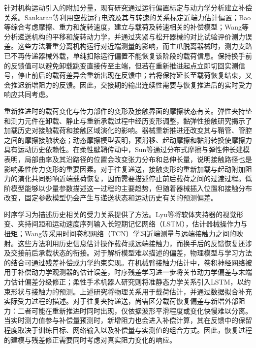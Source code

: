\documentclass{JQRnew}
\begin{document}
针对机构运动引入的附加分量，现有研究通过运行偏置标定与动力学分析建立补偿关系。Sankaran等利用空载运行电流及其与转速的关系标定近端力估计偏置；Bao等综合考虑摩擦、重力和旋转速度，建立与载荷及转速相关的补偿模型；Wang等分析递送机构的平移和旋转动力学，并通过夹紧与松开器械的对比试验评价测力误差。这些方法着重分离机构运行对近端测量的影响，而主爪脱离器械时，测力支路已不再传递器械外载，单纯扣除运行偏置不能恢复该阶段的载荷信息。保持换手前的反馈值可以避免卸载跳变直接传至主端，但若在重新推进起点立即切回实测信号，停止前后的载荷差异会重新出现在反馈中；若将保持延长至载荷恢复结束，又会推迟新增阻力的反馈。因此，交接期的输出连续性需要与恢复推进后的实时受力响应共同考虑。

重新推进时的载荷变化与传力部件的变形及接触界面的摩擦状态有关。弹性夹持垫和测力元件在卸载、静止与重新承载过程中经历变形调整，黏弹性接触研究揭示了加载历史对接触载荷和接触区域演化的影响。器械重新推进还改变其与鞘管、管腔之间的摩擦接触状态；动态摩擦模型表明，预滑移、起动摩擦和黏滑转换使摩擦力具有运动历史依赖性。在柔性腱鞘传动中，Sun等通过分布式摩擦与弹性伸长建模表明，局部曲率及其沿路径的位置会改变张力分布和总伸长量，说明接触路径也是影响柔性传力变形的重要因素。对于往复递送，接触变形的重新加载与起动附加阻力的演化共同影响近端载荷恢复，因而需要描述停止前后载荷之间的过渡过程。低阶模型能够以少量参数描述这一过程的主要趋势，但随着器械插入位置和接触分布改变，固定参数模型仍会产生与递送状态和运动历史有关的预测偏差。

时序学习为描述历史相关的受力关系提供了方法。Lyu等将软体夹持器的视觉形变、夹持间距和运动速度序列输入长短期记忆网络（LSTM），估计器械操作力与扭矩；Wang等采用时间卷积网络（TCN）学习近端测量与远端接触力之间的映射。这些方法利用历史信息估计操作载荷或远端接触力，而换手后的反馈恢复还涉及交接前后承载状态的衔接。对于解析模型难以描述的偏差，物理模型与学习方法的结合可通过残差补偿或力学约束实现。在机械臂接触力估计中，卷积神经网络被用于补偿动力学观测器的估计误差，时序残差学习进一步将关节动力学偏差与末端力估计偏差分级修正；柔性手术机器人研究则将准静态力学关系引入LSTM，以约束形状与接触力的预测。上述研究将物理关系用于载荷估计，并通过数据拟合补充实际受力过程的描述。对于往复夹持递送，尚需区分载荷恢复偏差与新增外部阻力：二者可能在重新推进时同时出现，仅依据波形平滑程度或变化快慢难以分离。当实时测力值参与补偿量预测时，新增阻力也会进入补偿计算，其在反馈中的保留程度取决于训练目标、网络输入以及补偿量与实测值的组合方式。因此，恢复过程的建模与残差修正需要同时考虑对真实阻力变化的响应。
\end{document}
